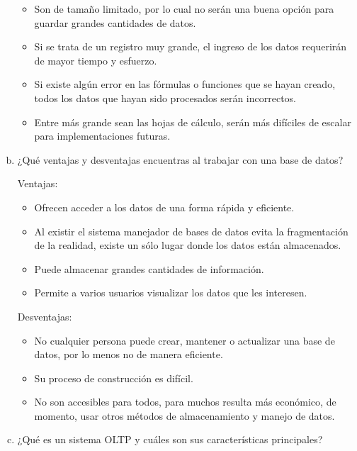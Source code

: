 \documentclass[12pt]{article}
\begin{document}
\begin{enumerate}[a.]
\begin{itemize}
    \item Son de tamaño limitado, por lo cual no serán una buena opción para guardar grandes cantidades de datos.

    \item Si se trata de un registro muy grande, el ingreso de los datos requerirán de mayor tiempo y esfuerzo.

    \item Si existe algún error en las fórmulas o funciones que se hayan creado, todos los datos que hayan sido procesados serán incorrectos.

    \item Entre más grande sean las hojas de cálculo, serán más difíciles de escalar para implementaciones futuras.
    


    
\end{itemize}


\item ¿Qué ventajas y desventajas encuentras al trabajar con una base de datos?

Ventajas:
\begin{itemize}
    \item Ofrecen acceder a los datos de una forma rápida y 
    eficiente.
    \item Al existir el sistema manejador de bases de datos evita la fragmentación de la realidad, existe un sólo lugar donde los datos están almacenados.
    \item Puede almacenar grandes cantidades de información.
    \item Permite a varios usuarios visualizar los datos que les interesen.
\end{itemize}

Desventajas:
\begin{itemize}
    \item No cualquier persona puede crear, mantener o actualizar una base de datos, por lo menos no de manera eficiente.
    \item Su proceso de construcción es difícil.
    \item No son accesibles para todos, para muchos resulta más económico, de momento, usar otros métodos de almacenamiento y
    manejo de datos.
\end{itemize}



\item ¿Qué es un sistema OLTP y cuáles son sus características principales?


\end{enumerate}
\end{document}
